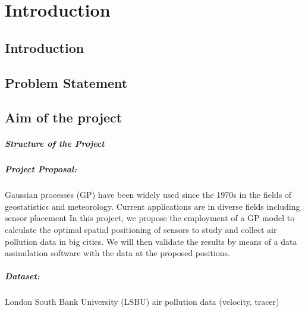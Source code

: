 \chapter{Introduction}

\section{Introduction}


\section{Problem Statement}



\section{Aim of the project }


\paragraph{Structure of the Project}



\paragraph{Project Proposal:}
Gaussian processes (GP) have been widely used since the 1970s in the fields of geostatistics and meteorology. Current applications are in diverse fields including sensor placement
In this project, we propose the employment of a GP model to calculate the optimal spatial positioning of sensors to study and collect air pollution data in big cities. We will then validate the results by means of a data assimilation software with the data at the proposed positions.

\paragraph{Dataset:} London South Bank University (LSBU) air pollution data (velocity, tracer)


